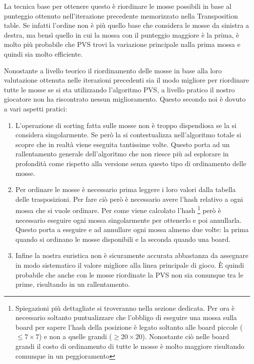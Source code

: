 \documentclass[a4paper]{article}
\begin{document}
La tecnica base per ottenere questo è riordinare le mosse possibili in base 
al punteggio ottenuto nell'iterazione precedente memorizzato nella Transposition
table. Se infatti l'ordine non è più quello base che considera le mosse da 
sinistra a destra, ma bensì quello in cui la mossa con il punteggio maggiore è
la prima, è molto più probabile che PVS trovi la variazione principale nalla 
prima mossa e quindi sia molto efficiente.

Nonostante a livello teorico il riordinamento delle mosse in base alla loro 
valutazione ottenuta nelle iterazioni precedenti sia il modo migliore per 
riordinare tutte le mosse se si sta utilizzando l'algoritmo PVS, a livello 
pratico il nostro giocatore non ha riscontrato nessun miglioramento. Questo 
secondo noi è dovuto a vari aspetti pratici:
\begin{enumerate}
  \item L'operazione di sorting fatta sulle mosse non è troppo dispendiosa 
    se la si considera singolarmente. Se però la si contestualizza 
    nell'algoritmo totale si scopre che in realtà viene eseguita tantissime 
    volte. Questo porta ad un rallentamento generale dell'algoritmo che non 
    riesce più ad esplorare in profondità come rispetto alla versione senza 
    questo tipo di ordinamento delle mosse.

  \item Per ordinare le mosse è necessario prima leggere i loro valori dalla 
    tabella delle trasposizioni. Per fare ciò però è necessario avere l'hash 
    relativo a ogni mossa che si vuole ordinare. Per come viene calcolato 
    l'hash \footnote{Spiegazioni più dettagliate si troveranno nella sezione
    dedicata. Per ora è necessario soltanto puntualizzare che l'obbligo di 
    eseguire una mossa sulla board per sapere l'hash della posizione è legato
    soltanto alle board piccole ($\leq 7 \times 7$) e non a quelle grandi 
    ($\geq 20 \times 20$). Nonostante ciò nelle board grandi il costo di 
    ordinamento di tutte le mosse è molto maggiore risultando comunque in un
    peggioramento} però è necessario eseguire ogni mossa singolarmente per 
    ottenerlo e poi annullarla. Questo porta a eseguire e ad annullare ogni 
    mossa almeno due volte: la prima quando si ordinano le mosse disponibili e 
    la seconda quando una board. 

  \item Infine la nostra euristica non è sicuramente accurata abbastanza da 
    assegnare in modo sistematico il valore migliore alla linea principale di 
    gioco. È quindi probabile che anche con le mosse riordinate la PVS non sia
    comunque tra le prime, risultando in un rallentamento.
\end{enumerate}
\end{document}
